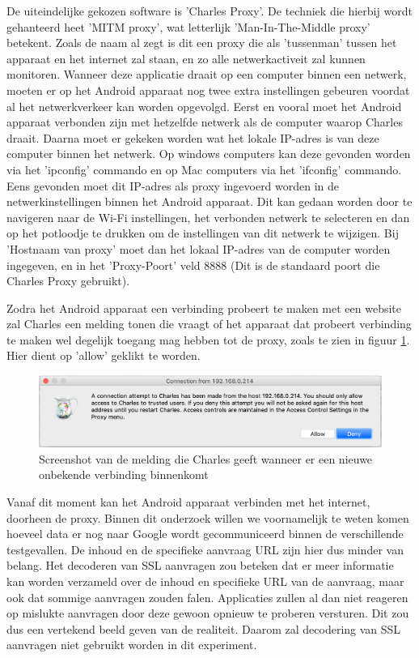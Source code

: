 De uiteindelijke gekozen software is 'Charles Proxy'. De techniek die hierbij wordt gehanteerd heet 'MITM proxy', wat letterlijk 'Man-In-The-Middle proxy' betekent. Zoals de naam al zegt is dit een proxy die als 'tussenman' tussen het apparaat en het internet zal staan, en zo alle netwerkactiveit zal kunnen monitoren. Wanneer deze applicatie draait op een computer binnen een netwerk, moeten er op het Android apparaat nog twee extra instellingen gebeuren voordat al het netwerkverkeer kan worden opgevolgd. Eerst en vooral moet het Android apparaat verbonden zijn met hetzelfde netwerk als de computer waarop Charles draait. Daarna moet er gekeken worden wat het lokale IP-adres is van deze computer binnen het netwerk. Op windows computers kan deze gevonden worden via het 'ipconfig' commando en op Mac computers via het 'ifconfig' commando. Eens gevonden moet dit IP-adres als proxy ingevoerd worden in de netwerkinstellingen binnen het Android apparaat. Dit kan gedaan worden door te navigeren naar de Wi-Fi instellingen, het verbonden netwerk te selecteren en dan op het potloodje te drukken om de instellingen van dit netwerk te wijzigen. Bij 'Hostnaam van proxy' moet dan het lokaal IP-adres van de computer worden ingegeven, en in het 'Proxy-Poort' veld 8888 (Dit is de standaard poort die Charles Proxy gebruikt). 

Zodra het Android apparaat een verbinding probeert te maken met een website zal Charles een melding tonen die vraagt of het apparaat dat probeert verbinding te maken wel degelijk toegang mag hebben tot de proxy, zoals te zien in figuur \ref{fig:charlesmelding}. Hier dient op 'allow' geklikt te worden. 

\begin{figure}
    \centering
    \includegraphics[width=1\textwidth]{img/charlesmelding.png}
    \caption{Screenshot van de melding die Charles geeft wanneer er een nieuwe onbekende verbinding binnenkomt}
    \label{fig:charlesmelding}
\end{figure}

Vanaf dit moment kan het Android apparaat verbinden met het internet, doorheen de proxy. Binnen dit onderzoek willen we voornamelijk te weten komen hoeveel data er nog naar Google wordt gecommuniceerd binnen de verschillende testgevallen. De inhoud en de specifieke aanvraag URL zijn hier dus minder van belang. Het decoderen van SSL aanvragen zou beteken dat er meer informatie kan worden verzameld over de inhoud en specifieke URL van de aanvraag, maar ook dat sommige aanvragen zouden falen. Applicaties zullen al dan niet reageren op mislukte aanvragen door deze gewoon opnieuw te proberen versturen. Dit zou dus een vertekend beeld geven van de realiteit. Daarom zal decodering van SSL aanvragen niet gebruikt worden in dit experiment. 

